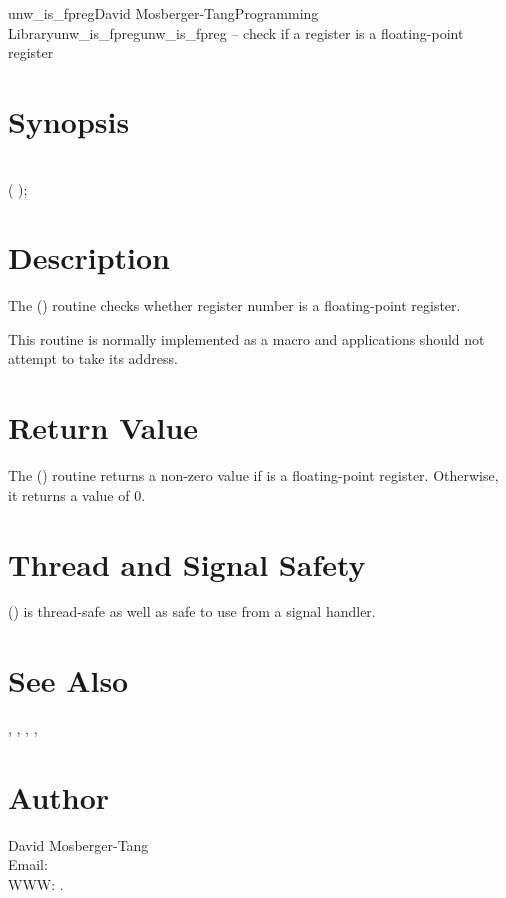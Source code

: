 \documentclass{article}
\begin{document}
\begin{Name}{3}{unw\_is\_fpreg}{David Mosberger-Tang}{Programming Library}{unw\_is\_fpreg}unw\_is\_fpreg -- check if a register is a floating-point register
\end{Name}

\section{Synopsis}

\\

 ( );\\

\section{Description}

The () routine checks whether register number
 is a floating-point register.

This routine is normally implemented as a macro and applications
should not attempt to take its address.

\section{Return Value}

The () routine returns a non-zero value if
 is a floating-point register.  Otherwise, it returns a value
of 0.

\section{Thread and Signal Safety}

() is thread-safe as well as safe to use
from a signal handler.

\section{See Also}

,
,
,
,

\section{Author}

\noindent
David Mosberger-Tang\\
Email: \\
WWW: .
\LatexManEnd
\end{document}
